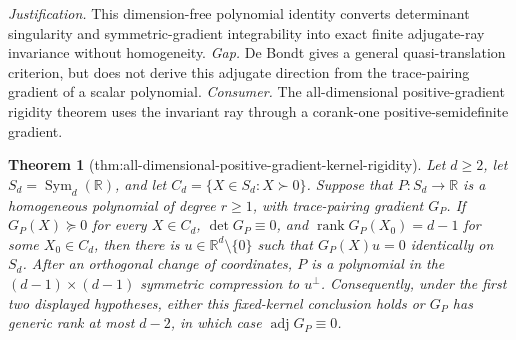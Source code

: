 \documentclass{article}
\newtheorem{theorem}{Theorem}
\begin{document}
\par\smallskip\noindent \textit{Justification.} This dimension-free polynomial identity converts determinant singularity and symmetric-gradient integrability into exact finite adjugate-ray invariance without homogeneity. \textit{Gap.} De Bondt gives a general quasi-translation criterion, but does not derive this adjugate direction from the trace-pairing gradient of a scalar polynomial. \textit{Consumer.} The all-dimensional positive-gradient rigidity theorem uses the invariant ray through a corank-one positive-semidefinite gradient.

\begin{theorem}[thm:all-dimensional-positive-gradient-kernel-rigidity]\label{thm:all-dimensional-positive-gradient-kernel-rigidity}
Let \(d\geq2\), let \(S_d=\operatorname{Sym}_{d}(\mathbb R)\), and let \(C_d=\{X\in S_d:X\succ0\}\).  Suppose that \(P:S_d\to\mathbb R\) is a homogeneous polynomial of degree \(r\geq1\), with trace-pairing gradient \(G_P\).  If \(G_P(X)\succeq0\) for every \(X\in C_d\), \(\det G_P\equiv0\), and \(\operatorname{rank}G_P(X_0)=d-1\) for some \(X_0\in C_d\), then there is \(u\in\mathbb R^d\setminus\{0\}\) such that \(G_P(X)u=0\) identically on \(S_d\).  After an orthogonal change of coordinates, \(P\) is a polynomial in the \((d-1)\times(d-1)\) symmetric compression to \(u^\perp\).  Consequently, under the first two displayed hypotheses, either this fixed-kernel conclusion holds or \(G_P\) has generic rank at most \(d-2\), in which case \(\operatorname{adj}G_P\equiv0\).
\end{theorem}
\end{document}
